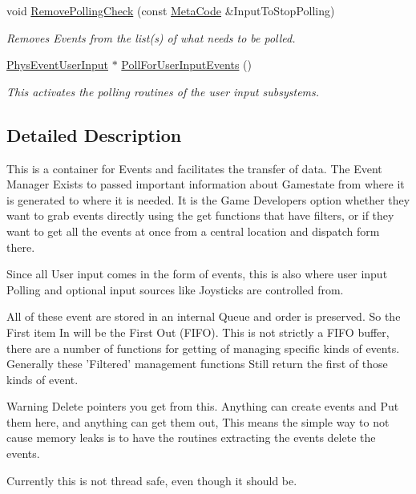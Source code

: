 \begin{DoxyCompactItemize}
void \hyperlink{classPhysEventManager_af81bf9a5f081f44a6cd91fdd19d4a42a}{RemovePollingCheck} (const \hyperlink{classphys_1_1MetaCode}{MetaCode} \&InputToStopPolling)
\begin{DoxyCompactList}\small\item\em Removes Events from the list(s) of what needs to be polled. \item\end{DoxyCompactList}\item 
\hyperlink{classPhysEventUserInput}{PhysEventUserInput} $\ast$ \hyperlink{classPhysEventManager_ac66ebe495e2a77d06803291711528db2}{PollForUserInputEvents} ()
\begin{DoxyCompactList}\small\item\em This activates the polling routines of the user input subsystems. \item\end{DoxyCompactList}\end{DoxyCompactItemize}


\subsection{Detailed Description}
This is a container for Events and facilitates the transfer of data. The Event Manager Exists to passed important information about Gamestate from where it is generated to where it is needed. It is the Game Developers option whether they want to grab events directly using the get functions that have filters, or if they want to get all the events at once from a central location and dispatch form there. \par
 Since all User input comes in the form of events, this is also where user input Polling and optional input sources like Joysticks are controlled from. \par
 All of these event are stored in an internal Queue and order is preserved. So the First item In will be the First Out (FIFO). This is not strictly a FIFO buffer, there are a number of functions for getting of managing specific kinds of events. Generally these 'Filtered' management functions Still return the first of those kinds of event. \begin{DoxyWarning}{Warning}
Delete pointers you get from this. Anything can create events and Put them here, and anything can get them out, This means the simple way to not cause memory leaks is to have the routines extracting the events delete the events. 

Currently this is not thread safe, even though it should be. 
\end{DoxyWarning}


